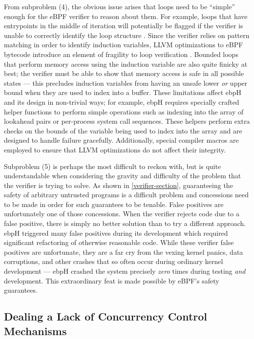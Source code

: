 \documentclass[
  12pt]{findlay}
\begin{document}
From subproblem (4), the obvious issue arises that loops need to be
``simple'' enough for the eBPF verifier to reason about them. For
example, loops that have entrypoints in the middle of iteration will
potentially be flagged if the verifier is unable to correctly identify
the loop structure \autocite{corbet18}. Since the verifier relies on
pattern matching in order to identify induction variables, LLVM
optimizations to eBPF bytecode introduce an element of fragility to loop
verification \autocite{corbet18}. Bounded loops that perform memory
access using the induction variable are also quite finicky at best; the
verifier must be able to show that memory access is safe in all possible
states --- this precludes induction variables from having an unsafe
lower \emph{or} upper bound when they are used to index into a buffer.
These limitations affect ebpH and its design in non-trivial ways; for
example, ebpH requires specially crafted helper functions to perform
simple operations such as indexing into the array of lookahead pairs or
per-process system call sequences. These helpers perform extra checks on
the bounds of the variable being used to index into the array and are
designed to handle failure gracefully. Additionally, special compiler
macros are employed to ensure that LLVM optimizations do not affect
their integrity.

Subproblem (5) is perhaps the most difficult to reckon with, but is
quite understandable when considering the gravity and difficulty of the
problem that the verifier is trying to solve. As shown in
\autoref{verifier-section}, guaranteeing the safety of arbitrary
untrusted programs is a difficult problem and concessions need to be
made in order for such guarantees to be tenable. False positives are
unfortunately one of those concessions. When the verifier rejects code
due to a false positive, there is simply no better solution than to try
a different approach. ebpH triggered many false positives during its
development which required significant refactoring of otherwise
reasonable code. While these verifier false positives are unfortunate,
they are a far cry from the vexing kernel panics, data corruptions, and
other crashes that so often occur during ordinary kernel development ---
ebpH crashed the system precisely \emph{zero} times during testing
\emph{and} development. This extraordinary feat is made possible by
eBPF's safety guarantees.

\hypertarget{dealing-a-lack-of-concurrency-control-mechanisms}{%
\subsection{Dealing a Lack of Concurrency Control
Mechanisms}\label{dealing-a-lack-of-concurrency-control-mechanisms}}
\end{document}
